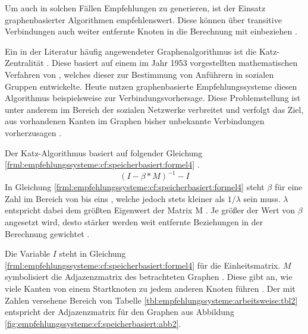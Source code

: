 Um auch in solchen Fällen Empfehlungen zu generieren, ist der Einsatz graphenbasierter Algorithmen empfehlenswert. Diese können über transitive Verbindungen auch weiter entfernte Knoten in die Berechnung mit einbeziehen \cite[S. 60f.]{recommenderSystems:2016}.

Ein in der Literatur häufig angewendeter Graphenalgorithmus ist die Katz-Zentralität \cite[S. 6]{guns:2014}\cite[S. 1f.]{huang:2004}\cite[S. 1ff.]{zhan:2017}. Diese basiert auf einem im Jahr 1953 vorgestellten mathematischen Verfahren von \textcite[S. 1ff.]{katz:1953}, welches dieser zur Bestimmung von Anführern in sozialen Gruppen entwickelte. Heute nutzen graphenbasierte Empfehlungssysteme diesen Algorithmus beispielsweise zur Verbindungsvorhersage. Diese Problemstellung ist unter anderem im Bereich der sozialen Netzwerke verbreitet und verfolgt das Ziel, aus vorhandenen Kanten im Graphen bisher unbekannte Verbindungen vorherzusagen \cite[S. 1ff.]{libenNowell:2007}.

Der Katz-Algorithmus basiert auf folgender Gleichung \ref{frml:empfehlungssysteme:cf:speicherbasiert:formel4} \cite[S. 4]{libenNowell:2007}.
\begin{equation}
	(I - \beta * M)^{-1} - I
	\label{frml:empfehlungssysteme:cf:speicherbasiert:formel4}
\end{equation}
In Gleichung \ref{frml:empfehlungssysteme:cf:speicherbasiert:formel4} steht $\beta$ für eine Zahl im Bereich von \nullWert bis eins \cite[S. 6]{guns:2014}, welche jedoch stets kleiner als $1/\lambda$ sein muss. $\lambda$ entspricht dabei dem größten Eigenwert der Matrix M \cite[S. 6]{zhan:2017}. Je größer der Wert von $\beta$ angesetzt wird, desto stärker werden weit entfernte Beziehungen in der Berechnung gewichtet \cite[S. 6]{guns:2014}.

Die Variable $I$ steht in Gleichung \ref{frml:empfehlungssysteme:cf:speicherbasiert:formel4} für die Einheitsmatrix. $M$ symbolisiert die Adjazenzmatrix des betrachteten Graphen \cite[S. 4]{libenNowell:2007}. Diese gibt an, wie viele Kanten von einem Startknoten zu jedem anderen Knoten führen \cite[S. 6]{guns:2014}. Der mit Zahlen versehene Bereich von Tabelle \ref{tbl:empfehlungssysteme:arbeitsweise:tbl2} entspricht der Adjazenzmatrix für den Graphen aus Abbildung \ref{fig:empfehlungssysteme:cf:speicherbasiert:abb2}.

